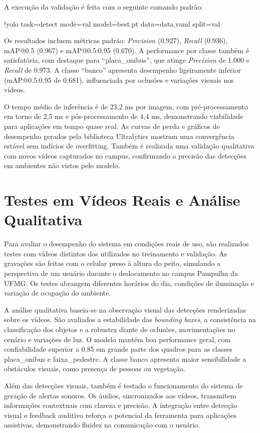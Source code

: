 A execução da validação é feita com o seguinte comando padrão:

!yolo task=detect mode=val model=best.pt data=data.yaml split=val

Os resultados incluem métricas padrão: \textit{Precision} (0.927), \textit{Recall} (0.936), mAP@0.5 (0.967) e mAP@0.5:0.95 (0.670). A performance por classe também é satisfatória, com destaque para “placa\_onibus”, que atinge \textit{Precision} de 1.000 e \textit{Recall} de 0.973. A classe “banco” apresenta desempenho ligeiramente inferior (mAP@0.5:0.95 de 0.681), influenciada por oclusões e variações visuais nos vídeos.

O tempo médio de inferência é de 23,2 ms por imagem, com pré-processamento em torno de 2,5 ms e pós-processamento de 4,4 ms, demonstrando viabilidade para aplicações em tempo quase real. As curvas de perda e gráficos de desempenho gerados pela biblioteca Ultralytics mostram uma convergência estável sem indícios de overfitting. Também é realizada uma validação qualitativa com novos vídeos capturados no campus, confirmando a precisão das detecções em ambientes não vistos pelo modelo.

\section{\textbf{Testes em Vídeos Reais e Análise Qualitativa}}

Para avaliar o desempenho do sistema em condições reais de uso, são realizados testes com vídeos distintos dos utilizados no treinamento e validação. As gravações são feitas com o celular preso à altura do peito, simulando a perspectiva de um usuário durante o deslocamento no campus Pampulha da UFMG. Os testes abrangem diferentes horários do dia, condições de iluminação e variação de ocupação do ambiente.

A análise qualitativa baseia-se na observação visual das detecções renderizadas sobre os vídeos. São avaliados a estabilidade das \textit{bounding boxes}, a consistência na classificação dos objetos e a robustez diante de oclusões, movimentações no cenário e variações de luz. O modelo mantém boa performance geral, com confiabilidade superior a 0.85 em grande parte dos quadros para as classes placa\_onibus e faixa\_pedestre. A classe banco apresenta maior sensibilidade a obstáculos visuais, como presença de pessoas ou vegetação.

Além das detecções visuais, também é testado o funcionamento do sistema de geração de alertas sonoros. Os áudios, sincronizados aos vídeos, transmitem informações contextuais com clareza e precisão. A integração entre detecção visual e feedback auditivo reforça o potencial da ferramenta para aplicações assistivas, demonstrando fluidez na comunicação com o usuário.

